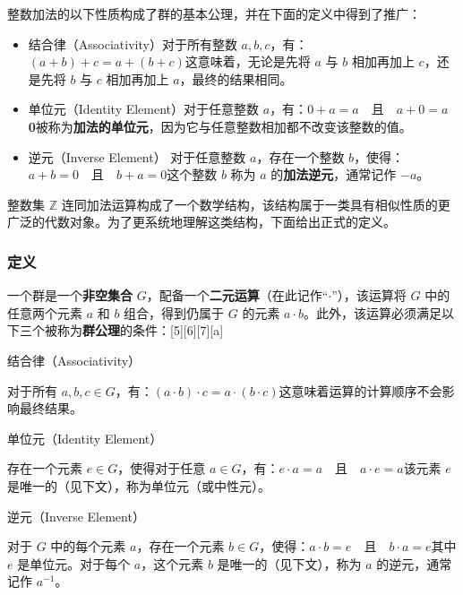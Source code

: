 整数加法的以下性质构成了群的基本公理，并在下面的定义中得到了推广：  
\begin{itemize}
\item 结合律（Associativity）对于所有整数 \(a, b, c\)，有：\((a + b) + c = a + (b + c)\)这意味着，无论是先将 \(a\) 与 \(b\) 相加再加上 \(c\)，还是先将 \(b\) 与 \(c\) 相加再加上 \(a\)，最终的结果相同。  
\item 单位元（Identity Element）对于任意整数 \(a\)，有：\(0 + a = a \quad \text{且} \quad a + 0 = a\) \textbf{0}被称为\textbf{加法的单位元}，因为它与任意整数相加都不改变该整数的值。  
\item 逆元（Inverse Element） 对于任意整数 \(a\)，存在一个整数 \(b\)，使得： \(a + b = 0 \quad \text{且} \quad b + a = 0\)这个整数 \(b\) 称为 \(a\) 的\textbf{加法逆元}，通常记作 \(-a\)。  
\end{itemize}
整数集 \(\mathbb{Z}\) 连同加法运算构成了一个数学结构，该结构属于一类具有相似性质的更广泛的代数对象。为了更系统地理解这类结构，下面给出正式的定义。
\subsubsection{定义} 
一个群是一个\textbf{非空集合 }\( G \)，配备一个\textbf{二元运算}（在此记作“\( \cdot \)”），该运算将 \( G \) 中的任意两个元素 \( a \) 和 \( b \) 组合，得到仍属于 \( G \) 的元素 \( a \cdot b \)。此外，该运算必须满足以下三个被称为\textbf{群公理}的条件：[5][6][7][a]  

结合律（Associativity） 

对于所有 \( a, b, c \in G \)，有：\((a \cdot b) \cdot c = a \cdot (b \cdot c)\)这意味着运算的计算顺序不会影响最终结果。  

单位元（Identity Element） 

存在一个元素 \( e \in G \)，使得对于任意 \( a \in G \)，有：\(e \cdot a = a \quad \text{且} \quad a \cdot e = a\)该元素 \( e \) 是唯一的（见下文），称为单位元（或中性元）。  

逆元（Inverse Element）

对于 \( G \) 中的每个元素 \( a \)，存在一个元素 \( b \in G \)，使得：\(a \cdot b = e \quad \text{且} \quad b \cdot a = e\)其中 \( e \) 是单位元。对于每个 \( a \)，这个元素 \( b \) 是唯一的（见下文），称为 \( a \) 的逆元，通常记作 \( a^{-1} \)。